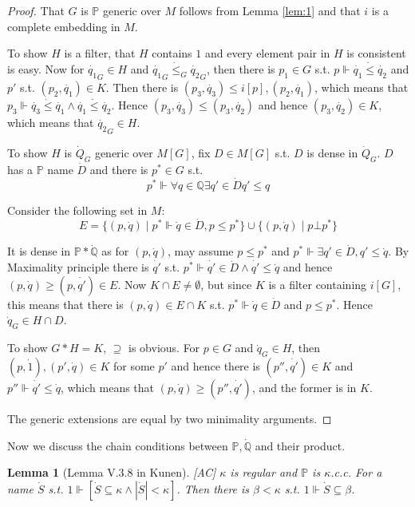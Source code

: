 \documentclass{article}
\newtheorem{lemma}{Lemma}
\newcommand{\bbP}{\mathbb{P}}
\newcommand{\bbQ}{\mathbb{Q}}
\begin{document}
\begin{proof}
    That $G$ is $\bbP$ generic over $M$ follows from Lemma \ref{lem:1} and that $i$ is a complete embedding in $M$.

    To show $H$ is a filter, that $H$ contains $1$ and every element pair in $H$ is consistent is easy. Now for $\dot{q_1}_G\in H$ and $\dot{q_1}_G\dot{\leq}_G\dot{q_2}_G$, then there is $p_1\in G$ s.t. $p\Vdash \dot{q_1}\dot{\leq}\dot{q_2}$ and $p'$ s.t. $(p_2,\dot{q_1})\in K$. Then there is $(p_3,\dot{q_3})\leq i[p], (p_2,\dot{q_1})$, which means that $p_3\Vdash \dot{q_3}\dot{\leq}\dot{q_1}\land\dot{q_1}\dot{\leq}\dot{q_2}$. Hence $(p_3,\dot{q_3})\leq (p_3,\dot{q_2})$ and hence $(p_3,\dot{q_2})\in K$, which means that $\dot{q_2}_G\in H$.

    To show $H$ is $\dot{Q}_G$ generic over $M[G]$, fix $D\in M[G]$ s.t. $D$ is dense in $\dot{Q}_G$. $D$ has a $\bbP$ name $\dot{D}$ and there is $p^*\in G$ s.t. $$p^*\Vdash \forall q\in \bbQ\exists q'\in \dot{D}q'\leq q$$

    Consider the following set in $M$: $$E = \{(p,\dot{q})\mid p^*\Vdash \dot{q}\in \dot{D}, p\leq p^*\}\cup \{(p, \dot{q})\mid p\bot p^*\}$$

    It is dense in $\bbP*\dot{\bbQ}$ as for $(p,\dot{q})$, may assume $p\leq p^*$ and $p^*\Vdash \exists q'\in \dot{D},q'\leq \dot{q}$. By Maximality principle there is $\dot{q'}$ s.t. $p^*\Vdash \dot{q'}\in \dot{D}\land \dot{q'}\leq \dot{q}$ and hence $(p,\dot{q})\geq (p,\dot{q'})\in E$. Now $K\cap E\neq \emptyset$, but since $K$ is a filter containing $i[G]$, this means that there is $(p,\dot{q})\in E\cap K$ s.t. $p^*\Vdash \dot{q}\in \dot{D}$ and $p\leq p^*$. Hence $\dot{q}_G\in H\cap D$.

    To show $G*H = K$, $\supseteq$ is obvious. For $p\in G$ and $\dot{q}_G\in H$, then $(p,\dot{1}), (p', \dot{q})\in K$ for some $p'$ and hence there is $(p'',\dot{q'})\in K$ and $p''\Vdash \dot{q'}\leq \dot{q}$, which means that $(p,\dot{q})\geq (p'',\dot{q'})$, and the former is in $K$.

    The generic extensions are equal by two minimality arguments.
\end{proof}

Now we discuss the chain conditions between $\mathbb{P}, \dot{\bbQ}$ and their product.

\begin{lemma}[Lemma V.3.8 in Kunen][AC]
    $\kappa$ is regular and $\bbP$ is $\kappa$.c.c. For a name $\dot{S}$ s.t. $1\Vdash [\dot{S}\subseteq \kappa\land |\dot{S}|<\kappa]$. Then there is $\beta<\kappa$ s.t. $1\Vdash \dot{S}\subseteq \beta$.
\end{lemma}
\end{document}
